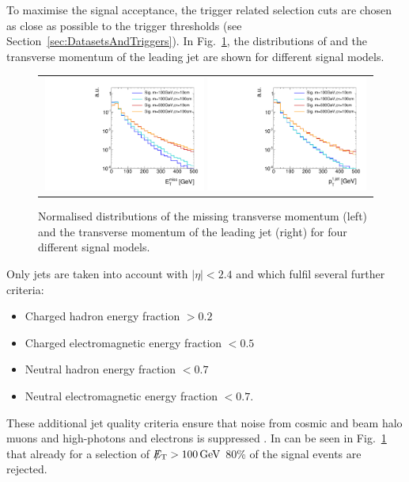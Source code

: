 To maximise the signal acceptance, the trigger related selection cuts are chosen as close as possible to the trigger thresholds (see Section~\ref{sec:DatasetsAndTriggers}).
In Fig.~\ref{fig:SignalMET+SignalJetPt}, the distributions of \met and the transverse momentum of the leading jet \ptfirstjet are shown for different signal models.
\begin{figure}[!b]
  \centering 
  \begin{tabular}{c}
    \includegraphics[width=0.49\textwidth]{figures/analysis/AnalysisSelection/hMetSmallRange_log_chiTracksnoSelection_4Signals.pdf}
    \includegraphics[width=0.49\textwidth]{figures/analysis/AnalysisSelection/h1stjetptSmallRange_log_chiTracksnoSelection_4Signals.pdf}
  \end{tabular}
  \caption{Normalised distributions of the missing transverse momentum (left) and the transverse momentum of the leading jet (right) for four different signal models.}
  \label{fig:SignalMET+SignalJetPt}
\end{figure}
Only jets are taken into account with $|\eta|<2.4$ and which fulfil several further criteria:
\begin{itemize}
\item Charged hadron energy fraction $>0.2$
\item Charged electromagnetic energy fraction $<0.5$
\item Neutral hadron energy fraction $<0.7$
\item Neutral electromagnetic energy fraction $<0.7$.
\end{itemize}
These additional jet quality criteria ensure that noise from cosmic and beam halo muons and high-\pt photons and electrons is suppressed \cite{bib:CMS:DM_8TeV_AN}.
In can be seen in Fig.~\ref{fig:SignalMET+SignalJetPt} that already for a selection of $\slash\mkern-12mu{E}_{\text{T}}>100\,\text{Ge}\kern-0.06667em\text{V}$ 80\% of the signal events are rejected.

